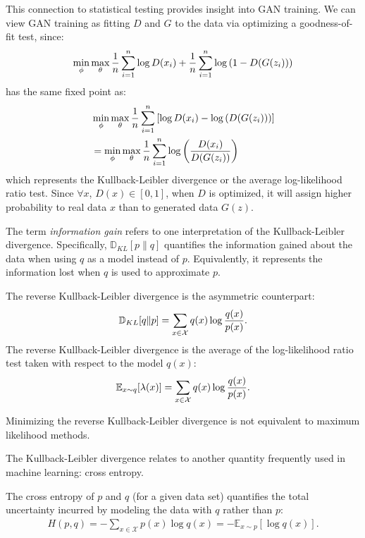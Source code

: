 This connection to statistical testing provides insight into GAN training. We can view GAN training as fitting $D$ and $G$ to the data via optimizing a goodness-of-fit test, since:
\begin{align}
	\min_\phi\max_\theta{1 \over n} \sum_{i=1}^n \log{D(x_i)} + {1
	\over n} \sum_{i=1}^n\log{(1 - D(G(z_i)))}
\end{align}
has the same fixed point as:
\begin{align}
	 & \min_\phi\max_\theta{1 \over n} \sum_{i=1}^n \left[\log{D(x_i)} - \log{(D(G(z_i)))}\right] \\
	 & = \min_\phi\max_\theta{1 \over n} \sum_{i=1}^n \log{\left({D(x_i) \over D(G(z_i))}\right)}
\end{align}
which represents the Kullback-Leibler divergence or the average log-likelihood ratio test. Since $\forall x$, $D(x) \in [0, 1]$, when $D$ is optimized, it will assign higher probability to real data $x$ than to generated data $G(z)$.

The term \textit{information gain} refers to one interpretation of the Kullback-Leibler divergence. Specifically, $\mathbb{D}_{KL}[p \| q]$ quantifies the information gained about the data when using $q$ as a model instead of $p$. Equivalently, it represents the information lost when $q$ is used to approximate $p$.

\begin{definition}
	The \textnormal{\sffamily reverse Kullback-Leibler divergence} is the asymmetric counterpart:
	\begin{align}
		\label{eq:reverse-KL}
		\mathbb{D}_{KL}[q \| p] = \sum_{x \in \mathcal{X}} q(x) \log{q(x) \over p(x)}.
	\end{align}
	The reverse Kullback-Leibler divergence is the average of the log-likelihood
	ratio test taken with respect to the model $q(x)$:
	\begin{align}
		\mathbb{E}_{x \sim q}[\lambda(x)] = \sum_{x \in \mathcal{X}} q(x)\log {q(x) \over p(x)}.
	\end{align}
\end{definition}

Minimizing the reverse Kullback-Leibler divergence is not equivalent to maximum likelihood methods.

The Kullback-Leibler divergence relates to another quantity frequently used in machine learning: cross entropy.

\begin{definition}
	The \textnormal{\sffamily cross entropy} of $p$ and $q$ (for a given data set) quantifies the total
	uncertainty incurred by modeling the data with $q$ rather than $p$:
	\begin{align}
		H(p, q) = - \sum_{x \in \mathcal{X}} p(x) \log q(x) = -\mathbb{E}_{x \sim p}\left[\log{q(x)}\right].
	\end{align}
\end{definition}


